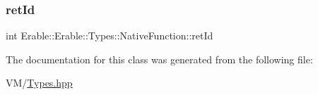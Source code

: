 \subsubsection{\texorpdfstring{retId}{retId}}
{\footnotesize\ttfamily int Erable\+::\+Erable\+::\+Types\+::\+Native\+Function\+::ret\+Id\hspace{0.3cm}{\ttfamily [private]}}



The documentation for this class was generated from the following file\+:\begin{DoxyCompactItemize}
\item 
V\+M/\mbox{\hyperlink{_types_8hpp}{Types.\+hpp}}\end{DoxyCompactItemize}
